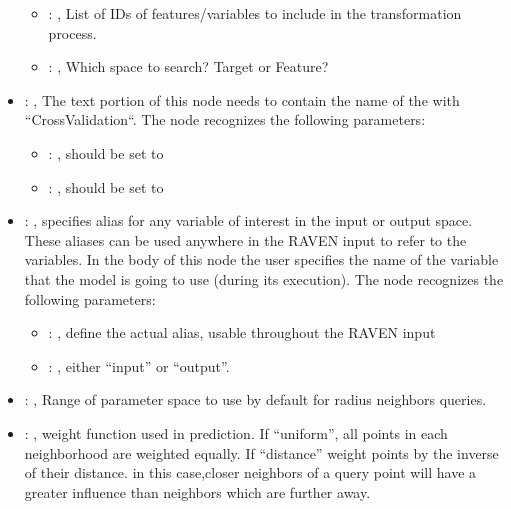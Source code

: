 \begin{itemize}
\begin{itemize}
        \item {}: , 
          List of IDs of features/variables to include in the transformation process.

        \item {}: , 
          Which space to search? Target or Feature?
      \end{itemize}

    \item {}: , 
      The text portion of this node needs to contain the name of the  with
               ``CrossValidation``.
      The  node recognizes the following parameters:
        \begin{itemize}
          \item {}: , 
            should be set to 
          \item {}: , 
            should be set to 
      \end{itemize}

    \item {}: , 
      specifies alias for         any variable of interest in the input or output space. These
      aliases can be used anywhere in the RAVEN input to         refer to the variables. In the body
      of this node the user specifies the name of the variable that the model is going to use
      (during its execution).
      The  node recognizes the following parameters:
        \begin{itemize}
          \item {}: , 
            define the actual alias, usable throughout the RAVEN input
          \item {}: , 
            either ``input'' or ``output''.
      \end{itemize}

    \item {}: , 
      Range of parameter space to use by default for radius neighbors queries.

    \item {}: , 
      weight function used in prediction. If ``uniform'', all points in each neighborhood
      are weighted equally. If ``distance'' weight points by the inverse of their distance. in this
      case,closer neighbors of a query point will have a greater influence than neighbors which are
      further away.


\end{itemize}
